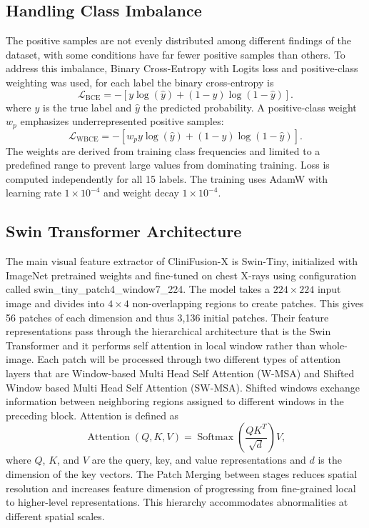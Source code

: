\documentclass[conference]{IEEEtran}
\begin{document}
\subsection{\textbf{Handling Class Imbalance}}
The positive samples are not evenly distributed among different findings of the dataset, with some conditions have far fewer positive samples than others. To address this imbalance, Binary Cross-Entropy with Logits loss and positive-class weighting was used, for each label the binary cross-entropy is
\begin{equation}
\mathcal{L}_{\mathrm{BCE}}
=
-\left[
y\log(\hat{y})
+
(1-y)\log(1-\hat{y})
\right].
\end{equation}
where $y$ is the true label and $\hat{y}$ the predicted probability. A positive-class weight $w_p$ emphasizes underrepresented positive samples:
\begin{equation}
\mathcal{L}_{\mathrm{WBCE}}
=
-\left[
w_p y\log(\hat{y})
+
(1-y)\log(1-\hat{y})
\right].
\end{equation}
The weights are derived from training class frequencies and limited to a predefined range to prevent large values from dominating training. Loss is computed independently for all 15 labels. The training uses AdamW with learning rate \(1\times10^{-4}\) and weight decay \(1\times10^{-4}\).
\subsection{\textbf{Swin Transformer Architecture}}
The main visual feature extractor of CliniFusion-X is Swin-Tiny, initialized with ImageNet pretrained weights and fine-tuned on chest X-rays using configuration called \textsf{swin\_tiny\_patch4\_window7\_224}.
The model takes a $224 \times 224$ input image and divides into $4 \times 4$ non-overlapping regions to create patches. This gives 56 patches of each dimension and thus 3,136 initial patches. Their feature representations pass through the hierarchical architecture that is the Swin Transformer and it performs self attention in local window rather than whole-image. Each patch will be processed through two different types of attention layers that are  Window-based Multi Head Self Attention (W-MSA) and Shifted Window based Multi Head Self Attention (SW-MSA). Shifted windows exchange information between neighboring regions assigned to different windows in the preceding block. Attention is defined as
\begin{equation}
\operatorname{Attention}(Q,K,V)
=
\operatorname{Softmax}
\left(
\frac{QK^T}{\sqrt{d}}
\right)V,
\end{equation}
where $Q$, $K$, and $V$ are the query, key, and value representations and $d$ is the dimension of the key vectors.
The Patch Merging between stages reduces spatial resolution and increases feature dimension of progressing from fine-grained local to higher-level representations. This hierarchy accommodates abnormalities at different spatial scales.
\end{document}
